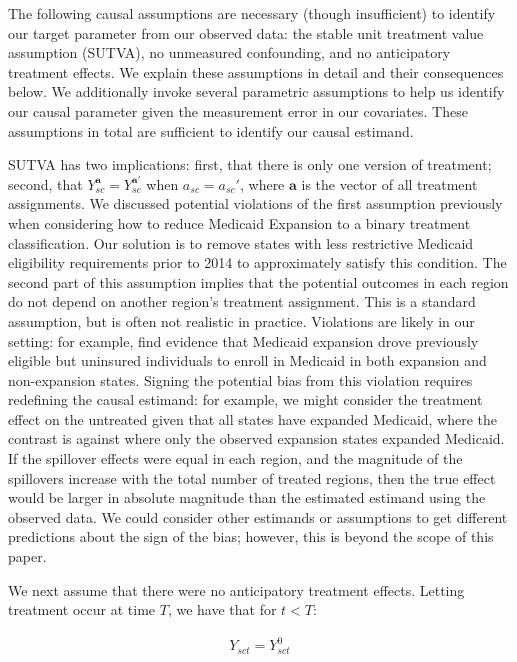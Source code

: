 The following causal assumptions are necessary (though insufficient) to identify our target parameter from our observed data: the stable unit treatment value assumption (SUTVA), no unmeasured confounding, and no anticipatory treatment effects. We explain these assumptions in detail and their consequences below. We additionally invoke several parametric assumptions to help us identify our causal parameter given the measurement error in our covariates. These assumptions in total are sufficient to identify our causal estimand.

SUTVA has two implications: first, that there is only one version of treatment; second, that $Y_{sc}^{\mathbf{a}} = Y_{sc}^{\mathbf{a}'}$ when $a_{sc} = a_{sc}'$, where $\mathbf{a}$ is the vector of all treatment assignments. We discussed potential violations of the first assumption previously when considering how to reduce Medicaid Expansion to a binary treatment classification. Our solution is to remove states with less restrictive Medicaid eligibility requirements prior to 2014 to approximately satisfy this condition. The second part of this assumption implies that the potential outcomes in each region do not depend on another region's treatment assignment. This is a standard assumption, but is often not realistic in practice. Violations are likely in our setting: for example, \cite{frean2017premium} find evidence that Medicaid expansion drove previously eligible but uninsured individuals to enroll in Medicaid in both expansion and non-expansion states. Signing the potential bias from this violation requires redefining the causal estimand: for example, we might consider the treatment effect on the untreated given that all states have expanded Medicaid, where the contrast is against where only the observed expansion states expanded Medicaid. If the spillover effects were equal in each region, and the magnitude of the spillovers increase with the total number of treated regions, then the true effect would be larger in absolute magnitude than the estimated estimand using the observed data. We could consider other estimands or assumptions to get different predictions about the sign of the bias; however, this is beyond the scope of this paper.

We next assume that there were no anticipatory treatment effects. Letting treatment occur at time $T$, we have that for $t < T$:

\begin{align*}
Y_{sct} = Y_{sct}^0
\end{align*}

